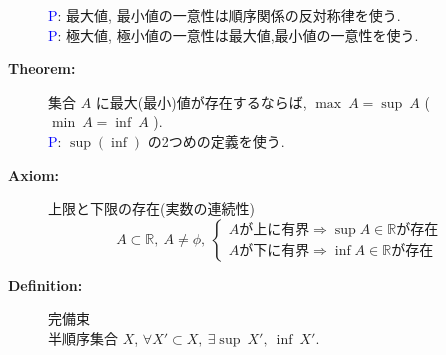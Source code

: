 \documentclass[english,dvipdfmx]{jsarticle}
\newcommand*{\proof}{\textcircled{\textcolor{blue}{\scriptsize P}}}
\begin{document}
\begin{description}
        \proof : 最大値, 最小値の一意性は順序関係の反対称律を使う. \\
        \proof : 極大値, 極小値の一意性は最大値,最小値の一意性を使う.
    \item[\bf{Theorem:}] 集合 $A$ に最大(最小)値が存在するならば, $\max \ A = \sup \ A$ ($\min \ A = \inf \ A$ ). \\
        \proof : $\sup(\inf)$ の2つめの定義を使う.
    \item[\bf{Axiom:}] 上限と下限の存在(実数の連続性)
        \begin{equation*} 
            A \subset \mathbb{R},\ A \neq \phi,\ 
            \begin{cases}
            A\text{が上に有界} \Rightarrow \sup A \in \mathbb{R} \text{が存在}  \\
            A\text{が下に有界} \Rightarrow \inf A \in \mathbb{R} \text{が存在}
            \end{cases} 
        \end{equation*}
    \item[\bf{Definition:}] 完備束 \\
        半順序集合 $X$, $\forall X' \subset X,\ \exists \sup \ X',\ \inf \ X'.$
\end{description}
\newpage
\end{document}
